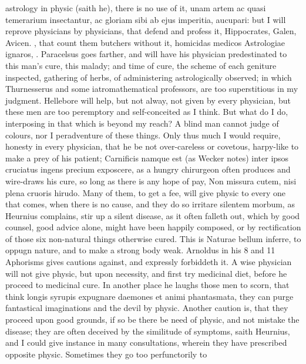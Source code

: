 {astrology in physic (saith he), there is no use of it, unam artem ac
quasi temerarium insectantur, ac gloriam sibi ab ejus imperitia,
aucupari: but I will reprove physicians by physicians, that defend and
profess it, Hippocrates, Galen, Avicen. \etc{}, that count them butchers
without it, homicidas medicos Astrologiae ignaros, \etc{}. Paracelsus goes
farther, and will have his physician predestinated to this man's
cure, this malady; and time of cure, the scheme of each geniture
inspected, gathering of herbs, of administering astrologically
observed; in which Thurnesserus and some iatromathematical professors,
are too superstitious in my judgment. Hellebore will help, but
not alway, not given by every physician, \etc{} but these men are too
peremptory and self-conceited as I think. But what do I do, interposing
in that which is beyond my reach? A blind man cannot judge of colours,
nor I peradventure of these things. Only thus much I would require,
honesty in every physician, that he be not over-careless or covetous,
harpy-like to make a prey of his patient; Carnificis namque est (as
Wecker notes) inter ipsos cruciatus ingens precium exposcere, as
a hungry chirurgeon often produces and wire-draws his cure, so long as
there is any hope of pay, Non missura cutem, nisi plena cruoris hirudo.
Many of them, to get a fee, will give physic to every one that
comes, when there is no cause, and they do so irritare silentem morbum,
as Heurnius complains, stir up a silent disease, as it often
falleth out, which by good counsel, good advice alone, might have been
happily composed, or by rectification of those six non-natural things
otherwise cured. This is Naturae bellum inferre, to oppugn nature, and
to make a strong body weak. Arnoldus in his 8 and 11 Aphorisms gives
cautions against, and expressly forbiddeth it. A wise physician
will not give physic, but upon necessity, and first try medicinal diet,
before he proceed to medicinal cure. In another place he laughs
those men to scorn, that think longis syrupis expugnare daemones et
animi phantasmata, they can purge fantastical imaginations and the
devil by physic. Another caution is, that they proceed upon good
grounds, if so be there be need of physic, and not mistake the disease;
they are often deceived by the similitude of symptoms, saith
Heurnius, and I could give instance in many consultations, wherein they
have prescribed opposite physic. Sometimes they go too perfunctorily to
}
